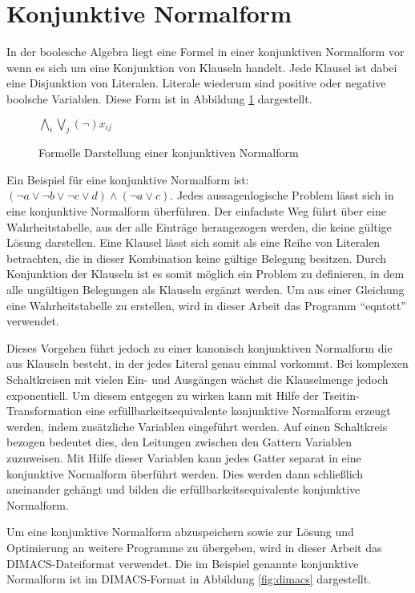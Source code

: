 \section{Konjunktive Normalform}
\label{sec:knf}

In der boolesche Algebra liegt eine Formel in einer konjunktiven Normalform vor wenn es sich um eine Konjunktion von Klauseln handelt.
Jede Klausel ist dabei eine Disjunktion von Literalen. Literale wiederum sind positive oder negative boolsche Variablen. Diese Form
ist in Abbildung \ref{fig:knf} dargestellt.

\begin{figure}[!h]
  \centering
  $ \bigwedge\limits_{i} \bigvee\limits_{j} (\neg)x_{ij} $
  \caption{Formelle Darstellung einer konjunktiven Normalform}
  \label{fig:knf}
\end{figure}

Ein Beispiel für eine konjunktive Normalform ist: $ (\neg a \vee \neg b \vee \neg c \vee d) \wedge (\neg a \vee c) $.
Jedes aussagenlogische Problem lässt sich in eine konjunktive Normalform überführen. Der einfachste Weg führt über
eine Wahrheitstabelle, aus der alle Einträge herangezogen werden, die keine gültige Lösung darstellen. Eine Klausel
lässt sich somit als eine Reihe von Literalen betrachten, die in dieser Kombination keine gültige Belegung besitzen.
Durch Konjunktion der Klauseln ist es somit möglich ein Problem zu definieren, in dem alle ungültigen Belegungen als
Klauseln ergänzt werden. Um aus einer Gleichung eine Wahrheitstabelle zu erstellen, wird in dieser Arbeit das Programm
"`eqntott"' verwendet.

Dieses Vorgehen führt jedoch zu einer kanonisch konjunktiven Normalform die aus Klauseln besteht, in der jedes Literal
genau einmal vorkommt. Bei komplexen Schaltkreisen mit vielen Ein- und Ausgängen wächst die Klauselmenge jedoch exponentiell.
Um diesem entgegen zu wirken kann mit Hilfe der Tseitin-Transformation \cite{wiki:tseitin} eine erfüllbarkeitsequivalente
konjunktive Normalform erzeugt werden, indem zusätzliche Variablen eingeführt werden. Auf einen Schaltkreis bezogen bedeutet
dies, den Leitungen zwischen den Gattern Variablen zuzuweisen. Mit Hilfe dieser Variablen kann jedes Gatter separat in eine
konjunktive Normalform überführt werden. Dies werden dann schließlich aneinander gehängt und bilden die erfüllbarkeitsequivalente
konjunktive Normalform.

Um eine konjunktive Normalform abzuspeichern sowie zur Lösung und Optimierung an weitere Programme zu übergeben, wird in dieser
Arbeit das DIMACS-Dateiformat verwendet. Die im Beispiel genannte konjunktive Normalform ist im DIMACS-Format in Abbildung
\ref{fig:dimacs} dargestellt.

